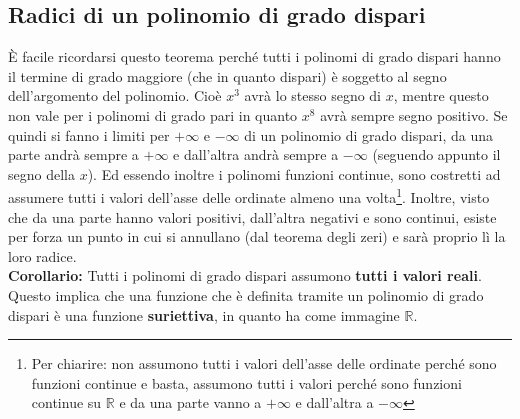 \subsection{Radici di un polinomio di grado dispari}

È facile ricordarsi questo teorema perché tutti i polinomi di grado dispari 
hanno il termine di grado maggiore (che in quanto dispari) è soggetto al segno 
dell'argomento del polinomio. Cioè $x^3$ avrà lo stesso segno di $x$, mentre 
questo non vale per i polinomi di grado pari in quanto $x^8$ avrà sempre segno 
positivo. Se quindi si fanno i limiti per $+\infty$ e $-\infty$ di un polinomio 
di grado dispari, da una parte andrà sempre a $+\infty$ e dall'altra andrà 
sempre a $-\infty$ (seguendo appunto il segno della $x$). Ed essendo inoltre i 
polinomi funzioni continue, sono costretti ad assumere tutti i valori dell'asse 
delle ordinate almeno una volta\footnote{Per chiarire: non assumono tutti i 
valori dell'asse delle ordinate perché sono funzioni continue e basta, assumono 
tutti i valori perché sono funzioni continue su $\mathbb{R}$ e da una parte 
vanno a $+\infty$ e dall'altra a $-\infty$}. Inoltre, visto che da una parte 
hanno valori positivi, dall'altra negativi e sono continui, esiste per forza un 
punto in cui si annullano (dal teorema degli zeri) e sarà proprio lì la loro 
radice.\\

\textbf{Corollario:}
Tutti i polinomi di grado dispari assumono \textbf{tutti i valori reali}. Questo 
implica che una funzione che è definita tramite un polinomio di grado dispari è 
una funzione \textbf{suriettiva}, in quanto ha come immagine $\mathbb{R}$.


